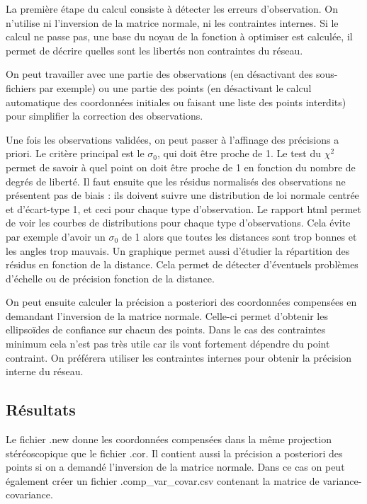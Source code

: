\documentclass[french]{report}
\begin{document}
La première étape du calcul consiste à détecter les erreurs d'observation. On n'utilise ni l'inversion de la matrice normale,
ni les contraintes internes.
Si le calcul ne passe pas, une base du noyau de la fonction à optimiser est calculée, il permet de décrire
quelles sont les libertés non contraintes du réseau.

On peut travailler avec une partie des observations (en désactivant des sous-fichiers par exemple) ou une partie des points
(en désactivant le calcul automatique des coordonnées initiales ou faisant une liste des points interdits) pour simplifier la
correction des observations.

Une fois les observations validées, on peut passer à l'affinage des précisions a priori.
Le critère principal est le $\sigma_0$, qui doit être proche de 1. Le test du $\chi^2$ permet de savoir à quel point
on doit être proche de 1 en fonction du nombre de degrés de liberté.
Il faut ensuite que les résidus normalisés des observations ne présentent pas de biais : ils doivent suivre une distribution
de loi normale centrée et d'écart-type 1, et ceci pour chaque type d'observation. Le rapport html permet de voir les
courbes de distributions pour chaque type d'observations. Cela évite par exemple d'avoir un $\sigma_0$ de 1 alors que toutes
les distances sont trop bonnes et les angles trop mauvais. Un graphique permet aussi d'étudier la répartition des résidus
en fonction de la distance. Cela permet de détecter d'éventuels problèmes d'échelle ou de précision fonction de la distance.

On peut ensuite calculer la précision a posteriori des coordonnées compensées en demandant l'inversion de la matrice normale.
Celle-ci permet d'obtenir les ellipsoïdes de confiance sur chacun des points. Dans le cas des contraintes minimum cela n'est
pas très utile car ils vont fortement dépendre du point contraint. On préférera utiliser les contraintes internes pour
obtenir la précision interne du réseau.


\subsection{Résultats}
Le fichier .new donne les coordonnées compensées dans la même projection stéréoscopique que le fichier .cor.
Il contient aussi la précision a posteriori des points si on a demandé l'inversion
de la matrice normale.
Dans ce cas on peut également créer un fichier .comp\_var\_covar.csv contenant la matrice de variance-covariance.
\end{document}
